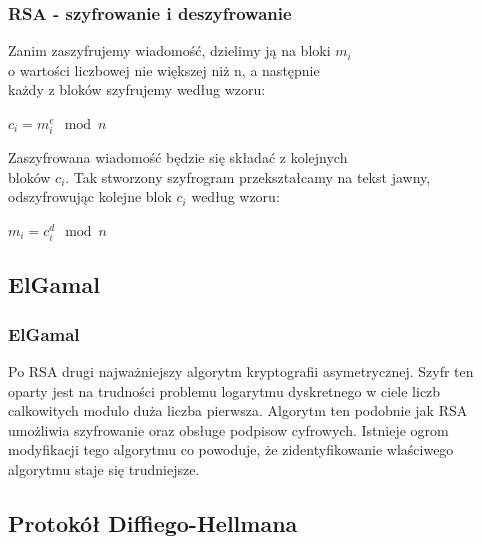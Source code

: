 \documentclass[xcolor=table]{beamer}
\begin{document}
\begin{frame}
  \frametitle{RSA - szyfrowanie i deszyfrowanie}
	
Zanim zaszyfrujemy wiadomość, dzielimy ją na bloki \begin{math}m_{i}\end{math}\\
o wartości liczbowej nie większej niż n, a następnie\\
każdy z bloków szyfrujemy według wzoru:

    \begin{math}c_{i} = m_{i}^e \mod n \end{math}\\
    \vspace{10 mm}
    
Zaszyfrowana wiadomość będzie się składać z kolejnych\\
bloków \begin{math}c_{i}\end{math}. Tak stworzony szyfrogram przekształcamy na tekst jawny, odszyfrowując kolejne blok \begin{math}c_{i}\end{math} według wzoru:

    \begin{math}m_{i} = c_{i}^d \mod n\end{math}

\end{frame}

\subsection{ElGamal}

\begin{frame}
  \frametitle{ElGamal}
	
Po RSA drugi najważniejszy algorytm kryptografii asymetrycznej. Szyfr ten oparty jest na trudności problemu logarytmu dyskretnego w ciele liczb calkowitych modulo duża liczba pierwsza. Algorytm ten podobnie jak RSA umożliwia szyfrowanie oraz obsługe podpisow cyfrowych. Istnieje ogrom modyfikacji tego algorytmu co powoduje, że zidentyfikowanie wlaściwego algorytmu staje się trudniejsze.

\end{frame}


\subsection{Protokół Diffiego-Hellmana}
\end{document}
